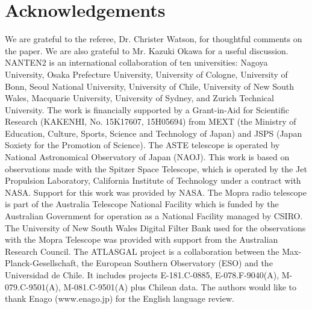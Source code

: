 \documentclass[onecolumn]{pasj01}
\begin{document}
{{{{{{\section*{Acknowledgements}
We are grateful to the referee, Dr. Christer Watson, for thoughtful comments on the paper. We are also grateful to Mr. Kazuki Okawa for a useful discussion.
NANTEN2 is an international collaboration of ten universities: Nagoya University, Osaka Prefecture University, University of Cologne, University of Bonn, Seoul National University, University of Chile, University of New South Wales, Macquarie University, University of Sydney, and Zurich Technical University.
The work is financially supported by a Grant-in-Aid for Scientific Research (KAKENHI, No. 15K17607, 15H05694) from MEXT (the Ministry of Education, Culture, Sports, Science and Technology of Japan) and JSPS (Japan Soxiety for the Promotion of Science).
The ASTE telescope is operated by National Astronomical Observatory of Japan (NAOJ).
This work is based on observations made with the Spitzer Space Telescope, which is operated by the Jet Propulsion Laboratory, California Institute of Technology under a contract with NASA. Support for this work was provided by NASA.
The Mopra radio telescope is part of the Australia Telescope National Facility which is funded by the Australian Government for operation as a National Facility managed by CSIRO. The University of New South Wales Digital Filter Bank used for the observations with the Mopra Telescope was provided with support from the Australian Research Council. The ATLASGAL project is a collaboration between the Max-Planck-Gesellschaft, the European Southern Observatory (ESO) and the Universidad de Chile. It includes projects E-181.C-0885, E-078.F-9040(A), M-079.C-9501(A), M-081.C-9501(A) plus Chilean data.
{The authors would like to thank Enago (www.enago.jp) for the English language review.}


}}}}}}
\end{document}
